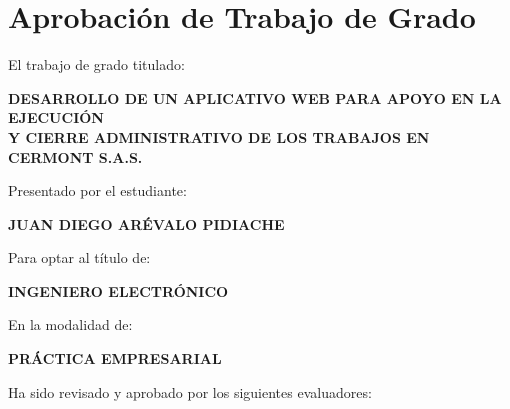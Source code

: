 ﻿%

\chapter*{Aprobación de Trabajo de Grado}

\vspace{2cm}

\noindent
El trabajo de grado titulado:

\vspace{0.5cm}

\begin{center}
\textbf{\Large DESARROLLO DE UN APLICATIVO WEB PARA APOYO EN LA EJECUCIÓN \\
Y CIERRE ADMINISTRATIVO DE LOS TRABAJOS EN CERMONT S.A.S.}
\end{center}

\vspace{0.8cm}

\noindent
Presentado por el estudiante:

\vspace{0.3cm}

\noindent
\textbf{JUAN DIEGO ARÉVALO PIDIACHE}

\vspace{0.8cm}

\noindent
Para optar al título de:

\vspace{0.3cm}

\noindent
\textbf{INGENIERO ELECTRÓNICO}

\vspace{1.5cm}

\noindent
En la modalidad de:

\vspace{0.3cm}

\noindent
\textbf{PRÁCTICA EMPRESARIAL}

\vspace{1.5cm}

\noindent
Ha sido revisado y aprobado por los siguientes evaluadores:

